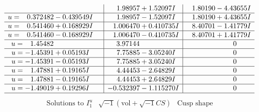 \documentclass[1p]{elsarticle_modified}
\theoremstyle{definition}
\newcommand{\I}{\sqrt{-1}}
\begin{document}
$$\begin{array}{c|c|c}
 & \phantom{-}1.98957 + 1.52097 I & \phantom{-}1.80190 - 4.43655 I \\ \hline\begin{aligned}
u &= \phantom{-}0.372482 - 0.439549 I\end{aligned}
 & \phantom{-}1.98957 - 1.52097 I & \phantom{-}1.80190 + 4.43655 I \\ \hline\begin{aligned}
u &= \phantom{-}0.541460 + 0.168929 I\end{aligned}
 & \phantom{-}1.006470 + 0.410735 I & \phantom{-}8.40701 - 1.41779 I \\ \hline\begin{aligned}
u &= \phantom{-}0.541460 - 0.168929 I\end{aligned}
 & \phantom{-}1.006470 - 0.410735 I & \phantom{-}8.40701 + 1.41779 I \\ \hline\begin{aligned}
u &= \phantom{-}1.45482\phantom{ +0.000000I}\end{aligned}
 & \phantom{-}3.97144\phantom{ +0.000000I} & \phantom{-0.000000 } 0 \\ \hline\begin{aligned}
u &= -1.45391 + 0.05193 I\end{aligned}
 & \phantom{-}7.75885 - 3.05240 I & \phantom{-0.000000 } 0 \\ \hline\begin{aligned}
u &= -1.45391 - 0.05193 I\end{aligned}
 & \phantom{-}7.75885 + 3.05240 I & \phantom{-0.000000 } 0 \\ \hline\begin{aligned}
u &= \phantom{-}1.47881 + 0.19165 I\end{aligned}
 & \phantom{-}4.44453 - 2.64829 I & \phantom{-0.000000 } 0 \\ \hline\begin{aligned}
u &= \phantom{-}1.47881 - 0.19165 I\end{aligned}
 & \phantom{-}4.44453 + 2.64829 I & \phantom{-0.000000 } 0 \\ \hline\begin{aligned}
u &= -1.49019 + 0.19296 I\end{aligned}
 & -0.532397 - 1.115270 I & \phantom{-0.000000 } 0\\
 \hline 
 \end{array}$$\newpage$$\begin{array}{c|c|c}  
\text{Solutions to }I^u_{1}& \I (\text{vol} + \sqrt{-1}CS) & \text{Cusp shape}\\

\end{array}$$
\end{document}
